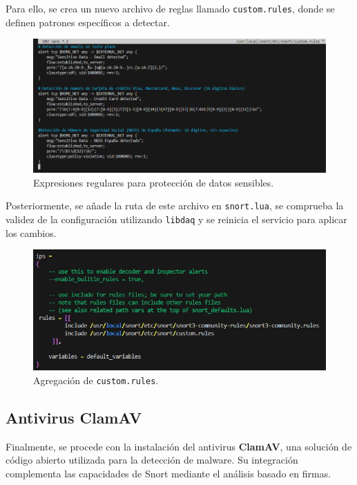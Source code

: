 \documentclass[12pt,a4paper]{report}
\begin{document}
Para ello, se crea un nuevo archivo de reglas llamado \texttt{custom.rules}, donde se definen patrones específicos a detectar.

\begin{figure}[H]
	\centering
	\includegraphics[scale=0.6]{sensitive/1.png}
	\caption{Expresiones regulares para protección de datos sensibles.}
\end{figure}

Posteriormente, se añade la ruta de este archivo en \texttt{snort.lua}, se comprueba la validez de la configuración utilizando \texttt{libdaq} y se reinicia el servicio para aplicar los cambios.

\begin{figure}[H]
	\centering
	\includegraphics[scale=0.6]{sensitive/2.png}
	\caption{Agregación de \texttt{custom.rules}.}
\end{figure}

\pagebreak

\subsection{Antivirus ClamAV}

Finalmente, se procede con la instalación del antivirus \textbf{ClamAV}, una solución de código abierto utilizada para la detección de malware. Su integración complementa las capacidades de Snort mediante el análisis basado en firmas.
\end{document}
